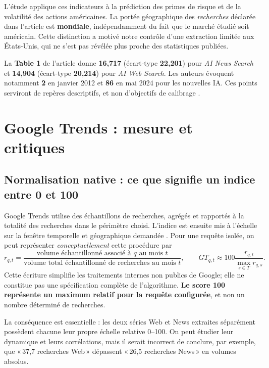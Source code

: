 \documentclass[11pt,a4paper]{article}
\begin{document}
L'étude applique ces indicateurs à la prédiction des primes de risque et de la volatilité des actions américaines. La portée géographique des \emph{recherches} déclarée dans l'article est \textbf{mondiale}, indépendamment du fait que le marché étudié soit américain. Cette distinction a motivé notre contrôle d'une extraction limitée aux États-Unis, qui ne s'est pas révélée plus proche des statistiques publiées.

La \textbf{Table 1} de l'article donne \textbf{16,717} (écart-type \textbf{22,201}) pour \emph{AI News Search} et \textbf{14,904} (écart-type \textbf{20,214}) pour \emph{AI Web Search}. Les auteurs évoquent notamment \textbf{2} en janvier 2012 et \textbf{86} en mai 2024 pour les nouvelles IA. Ces points serviront de repères descriptifs, et non d'objectifs de calibrage \cite{SalisuBadmus2026}.

\section{Google Trends : mesure et critiques}
\subsection{Normalisation native : ce que signifie un indice entre 0 et 100}
Google Trends utilise des échantillons de recherches, agrégés et rapportés à la totalité des recherches dans le périmètre choisi. L'indice est ensuite mis à l'échelle sur la fenêtre temporelle et géographique demandée \cite{GoogleFAQ}. Pour une requête isolée, on peut représenter \emph{conceptuellement} cette procédure par
\[
 r_{q,t}=\frac{\text{volume échantillonné associé à }q\text{ au mois }t}
 {\text{volume total échantillonné de recherches au mois }t},
 \qquad
 GT_{q,t}\approx 100\frac{r_{q,t}}{\max_{s\in T}r_{q,s}}.
\]
Cette écriture simplifie les traitements internes non publics de Google; elle ne constitue pas une spécification complète de l'algorithme. \textbf{Le score 100 représente un maximum relatif pour la requête configurée}, et non un nombre déterminé de recherches.

La conséquence est essentielle : les deux séries Web et News extraites séparément possèdent chacune leur propre échelle relative 0--100. On peut étudier leur dynamique et leurs corrélations, mais il serait incorrect de conclure, par exemple, que «\,37,7 recherches Web\,» dépassent «\,26,5 recherches News\,» en volumes absolus.
\end{document}
